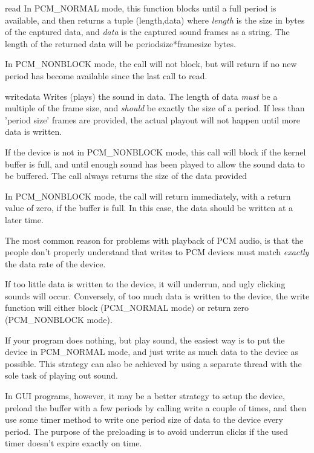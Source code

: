 \begin{methoddesc}[PCM]{read}{}
In PCM_NORMAL mode, this function blocks until a full period is available, and then returns a
tuple (length,data) where \emph{length} is the size in bytes of the captured data, and \emph{data}
is the captured sound frames as a string. The length of the returned data will be periodsize*framesize
bytes.

In PCM_NONBLOCK mode, the call will not block, but will return  if no new period
has become available since the last call to read.
\end{methoddesc}

\begin{methoddesc}[PCM]{write}{data}
Writes (plays) the sound in data. The length of data \emph{must} be a multiple of the frame size, and 
\emph{should} be exactly the size of a period. If less than 'period size' frames are provided, the actual
playout will not happen until more data is written.

If the device is not in PCM_NONBLOCK mode, this call will block if the kernel buffer is full, and
until enough sound has been played to allow the sound data to be buffered. The call always returns
the size of the data provided

In PCM_NONBLOCK mode, the call will return immediately, with a return value of zero, if the buffer is
full. In this case, the data should be written at a later time.

\end{methoddesc}


The most common reason for problems with playback of PCM audio, is that the people don't properly understand
that writes to PCM devices must match \emph{exactly} the data rate of the device.

If too little data is written to the device, it will underrun, and  ugly clicking sounds will occur. Conversely,
of too much data is written to the device, the write function will either block (PCM_NORMAL mode) or return zero
(PCM_NONBLOCK mode).

If your program does nothing, but play sound, the easiest way is to put the device in PCM_NORMAL mode, and just
write as much data to the device as possible. This strategy can also be achieved by using a separate thread
with the sole task of playing out sound.

In GUI programs, however, it may be a better strategy to setup the device, preload the buffer with a few
periods by calling write a couple of times, and then use some timer method to write one period size of data to
the device every period. The purpose of the preloading is to avoid underrun clicks if the used timer
doesn't expire exactly on time.

